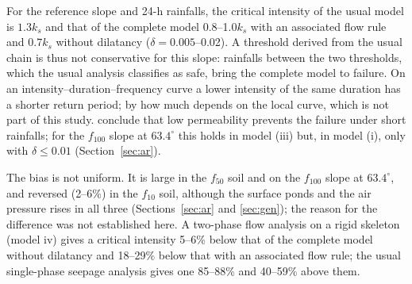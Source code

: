 For the reference slope and 24-h rainfalls, the critical intensity of the usual model is $1.3k_s$ and that of the
complete model 0.8--1.0$k_s$ with an associated flow rule and $0.7k_s$ without dilatancy ($\delta=0.005$--0.02).
A threshold derived from the usual chain is thus not conservative for this slope: rainfalls between the two
thresholds, which the usual analysis classifies as safe, bring the complete model to failure. On an
intensity--duration--frequency curve a lower intensity of the same duration has a shorter return period; by how much
depends on the local curve, which is not part of this study. \citet[p.~1541]{rahardjo2007} conclude that low
permeability prevents the failure under short rainfalls; for the $f_{100}$ slope at $63.4^\circ$ this holds in model
(iii) but, in model (i), only with $\delta\le0.01$ (Section~\ref{sec:ar}).

The bias is not uniform. It is large in the $f_{50}$ soil and on the $f_{100}$ slope at $63.4^\circ$, and reversed
(2--6\%) in the $f_{10}$ soil, although the surface ponds and the air pressure rises in all three (Sections~\ref{sec:ar} and
\ref{sec:gen}); the reason for the difference was not established here. A two-phase flow analysis on a rigid skeleton
(model iv) gives a critical intensity 5--6\% below that of the complete model without dilatancy and
18--29\% below that with an associated flow rule; the usual single-phase seepage analysis gives one 85--88\% and
40--59\% above them.
